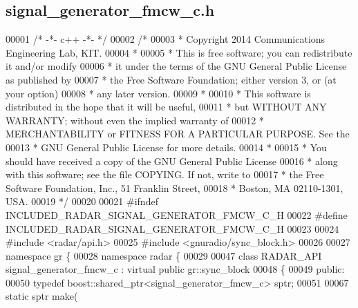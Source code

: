\subsection{signal\+\_\+generator\+\_\+fmcw\+\_\+c.\+h}
\label{signal__generator__fmcw__c_8h_source}

\begin{DoxyCode}
00001 \textcolor{comment}{/* -*- c++ -*- */}
00002 \textcolor{comment}{/*}
00003 \textcolor{comment}{ * Copyright 2014 Communications Engineering Lab, KIT.}
00004 \textcolor{comment}{ *}
00005 \textcolor{comment}{ * This is free software; you can redistribute it and/or modify}
00006 \textcolor{comment}{ * it under the terms of the GNU General Public License as published by}
00007 \textcolor{comment}{ * the Free Software Foundation; either version 3, or (at your option)}
00008 \textcolor{comment}{ * any later version.}
00009 \textcolor{comment}{ *}
00010 \textcolor{comment}{ * This software is distributed in the hope that it will be useful,}
00011 \textcolor{comment}{ * but WITHOUT ANY WARRANTY; without even the implied warranty of}
00012 \textcolor{comment}{ * MERCHANTABILITY or FITNESS FOR A PARTICULAR PURPOSE.  See the}
00013 \textcolor{comment}{ * GNU General Public License for more details.}
00014 \textcolor{comment}{ *}
00015 \textcolor{comment}{ * You should have received a copy of the GNU General Public License}
00016 \textcolor{comment}{ * along with this software; see the file COPYING.  If not, write to}
00017 \textcolor{comment}{ * the Free Software Foundation, Inc., 51 Franklin Street,}
00018 \textcolor{comment}{ * Boston, MA 02110-1301, USA.}
00019 \textcolor{comment}{ */}
00020 
00021 \textcolor{preprocessor}{#ifndef INCLUDED\_RADAR\_SIGNAL\_GENERATOR\_FMCW\_C\_H}
00022 \textcolor{preprocessor}{#define INCLUDED\_RADAR\_SIGNAL\_GENERATOR\_FMCW\_C\_H}
00023 
00024 \textcolor{preprocessor}{#include <radar/api.h>}
00025 \textcolor{preprocessor}{#include <gnuradio/sync\_block.h>}
00026 
00027 \textcolor{keyword}{namespace }gr \{
00028   \textcolor{keyword}{namespace }radar \{
00029 
00047     \textcolor{keyword}{class }RADAR_API signal_generator_fmcw_c : \textcolor{keyword}{virtual} \textcolor{keyword}{public} gr::sync\_block
00048     \{
00049      \textcolor{keyword}{public}:
00050       \textcolor{keyword}{typedef} boost::shared\_ptr<signal\_generator\_fmcw\_c> sptr;
00051 
00067       \textcolor{keyword}{static} sptr make(

\end{DoxyCode}

